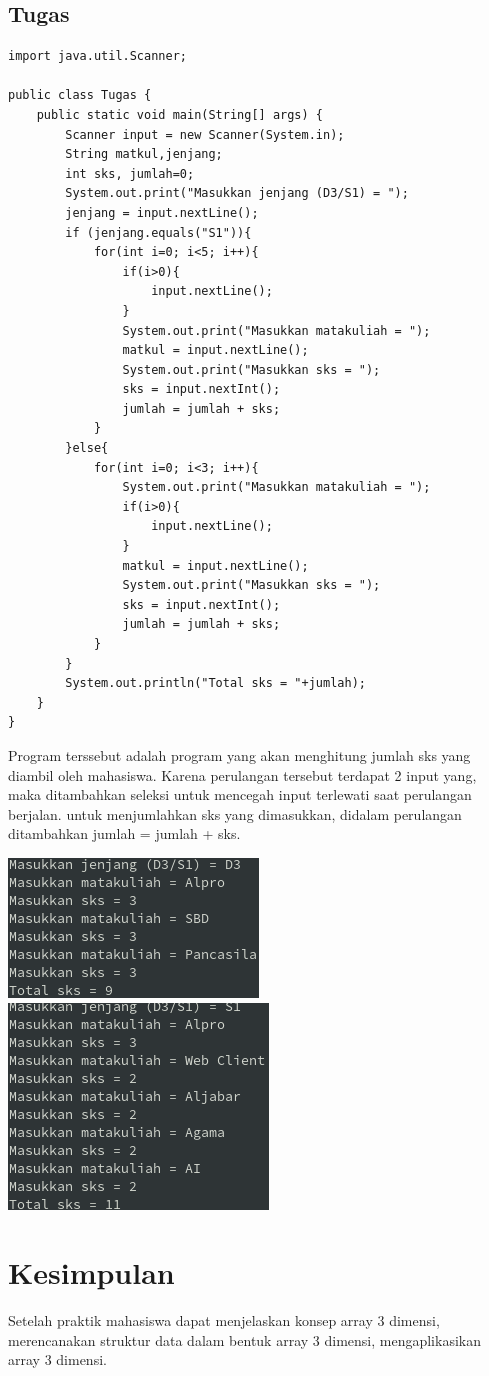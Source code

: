 \documentclass[a4paper,12pt]{article}
\begin{document}
\subsection{Tugas}
\begin{lstlisting}
import java.util.Scanner;

public class Tugas {
    public static void main(String[] args) {
        Scanner input = new Scanner(System.in);
        String matkul,jenjang;
        int sks, jumlah=0;
        System.out.print("Masukkan jenjang (D3/S1) = ");
        jenjang = input.nextLine();
        if (jenjang.equals("S1")){
            for(int i=0; i<5; i++){
                if(i>0){
                    input.nextLine();
                }
                System.out.print("Masukkan matakuliah = ");
                matkul = input.nextLine();
                System.out.print("Masukkan sks = ");
                sks = input.nextInt();
                jumlah = jumlah + sks;
            }
        }else{
            for(int i=0; i<3; i++){
                System.out.print("Masukkan matakuliah = ");
                if(i>0){
                    input.nextLine();
                }
                matkul = input.nextLine();
                System.out.print("Masukkan sks = ");
                sks = input.nextInt();
                jumlah = jumlah + sks;
            }
        }
        System.out.println("Total sks = "+jumlah);
    }
}
\end{lstlisting}
Program terssebut adalah program yang akan menghitung jumlah sks yang diambil oleh mahasiswa. Karena perulangan tersebut terdapat 2 input yang, maka ditambahkan seleksi untuk mencegah
input terlewati saat perulangan berjalan. untuk menjumlahkan sks yang dimasukkan, didalam perulangan ditambahkan jumlah = jumlah + sks.
\begin{center}
    \includegraphics[scale=.8]{12.png} 
    \includegraphics[scale=.8]{13.png} 
\end{center}

\newpage

\section{Kesimpulan}
Setelah praktik mahasiswa dapat menjelaskan konsep array 3 dimensi, merencanakan struktur data dalam bentuk array 3 dimensi, mengaplikasikan array 3 dimensi.
\end{document}
